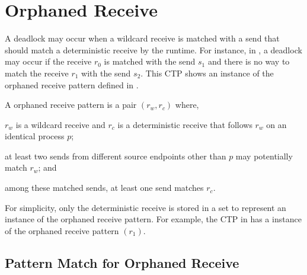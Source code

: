 \section{Orphaned Receive}


\examplefigone

A deadlock may occur when a wildcard receive is matched with a send that should match a deterministic receive by the runtime. For instance, in , a deadlock may occur if the receive $\mathit{r_{0}}$ is matched with the send $\mathit{s_{1}}$ and there is no way to match the receive $\mathit{r_{1}}$ with the send $\mathit{s_{2}}$. This CTP shows an instance of the orphaned receive pattern defined in .

\begin{definition}
A orphaned receive pattern is a pair $(\mathit{r_w}, \mathit{r_c})$ where, 
\begin{compactenum}
\item $\mathit{r_w}$ is a wildcard receive and $\mathit{r_c}$ is a deterministic receive that follows $\mathit{r_w}$ on an identical process $\mathit{p}$;
\item at least two sends from different source endpoints other than $\mathit{p}$ may potentially match $\mathit{r_w}$; and
\item among these matched sends, at least one send matches $\mathit{r_c}$. 
\end{compactenum}
\label{def:mismatch}
\end{definition}

For simplicity, only the deterministic receive is stored in a set to represent an instance of the orphaned receive pattern. For example, the CTP in  has a instance of the orphaned receive pattern $(r_1)$.

\subsection{Pattern Match for Orphaned Receive}


